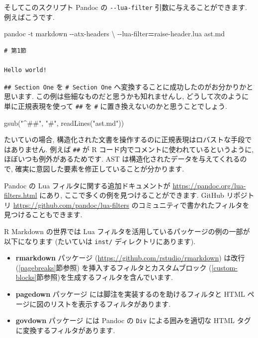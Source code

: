 \documentclass[
  11pt,
  lualatex,
  ja=standard]{bxjsreport}
\newenvironment{Shaded}{\begin{snugshade}}{\end{snugshade}}
\newcommand{\AttributeTok}[1]{\textcolor[rgb]{0.77,0.63,0.00}{#1}}
\newcommand{\DataTypeTok}[1]{\textcolor[rgb]{0.13,0.29,0.53}{#1}}
\newcommand{\ExtensionTok}[1]{#1}
\newcommand{\FunctionTok}[1]{\textcolor[rgb]{0.00,0.00,0.00}{#1}}
\newcommand{\NormalTok}[1]{#1}
\newcommand{\OperatorTok}[1]{\textcolor[rgb]{0.81,0.36,0.00}{\textbf{#1}}}
\newcommand{\StringTok}[1]{\textcolor[rgb]{0.31,0.60,0.02}{#1}}
\begin{document}
そしてこのスクリプト Pandoc の \texttt{-\/-lua-filter} 引数に与えることができます. 例えばこうです.

\begin{Shaded}
\begin{Highlighting}[numbers=left,,]
\ExtensionTok{pandoc} \AttributeTok{{-}t}\NormalTok{ markdown }\AttributeTok{{-}{-}atx{-}headers} \DataTypeTok{\textbackslash{}}
  \AttributeTok{{-}{-}lua{-}filter}\OperatorTok{=}\NormalTok{raise{-}header.lua ast.md}
\end{Highlighting}
\end{Shaded}

\begin{verbatim}
# 第1節

Hello world!
\end{verbatim}

\texttt{\#\# Section One} を \texttt{\# Section One} へ変換することに成功したのがお分かりかと思います. この例は些細なものだと思うかも知れませんし, どうして次のように単に正規表現を使って \texttt{\#\#} を \texttt{\#} に置き換えないのかと思うことでしょう.

\begin{Shaded}
\begin{Highlighting}[numbers=left,,]
\FunctionTok{gsub}\NormalTok{(}\StringTok{"\^{}\#\#"}\NormalTok{, }\StringTok{"\#"}\NormalTok{, }\FunctionTok{readLines}\NormalTok{(}\StringTok{"ast.md"}\NormalTok{))}
\end{Highlighting}
\end{Shaded}

たいていの場合, 構造化された文書を操作するのに正規表現はロバストな手段ではありません. 例えば \texttt{\#\#} が R コード内でコメントに使われているというように, ほぼいつも例外があるためです. AST は構造化されたデータを与えてくれるので, 確実に意図した要素を修正していることが分かります.

Pandoc の Lua フィルタに関する追加ドキュメントが \url{https://pandoc.org/lua-filters.html} にあり, ここで多くの例を見つけることができます. GitHub リポジトリ \url{https://github.com/pandoc/lua-filters} のコミュニティで書かれたフィルタを見つけることもできます.

R Markdown の世界では Lua フィルタを活用しているパッケージの例の一部が以下になります (たいていは \texttt{inst/} ディレクトリにあります).

\begin{itemize}
\item
  \textbf{rmarkdown} パッケージ (\url{https://github.com/rstudio/rmarkdown}) は改行 (\ref{pagebreaks}節参照) を挿入するフィルタとカスタムブロック (\ref{custom-blocks}節参照)を生成するフィルタを含んでいます.
\item
  \textbf{pagedown} パッケージ \autocite{R-pagedown} には脚注を実装するのを助けるフィルタと HTML ページに図のリストを表示するフィルタがあります.
\item
  \textbf{govdown} パッケージ \autocite{R-govdown} には Pandoc の \texttt{Div} による囲みを適切な HTML タグに変換するフィルタがあります.
\end{itemize}
\end{document}
